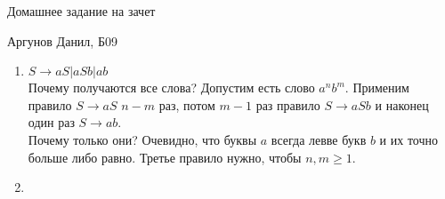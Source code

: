 \documentclass[12pt]{article}
\begin{document}
\begin{center} {\LARGE Домашнее задание на зачет} \end{center}
\begin{center} {Аргунов Данил, Б09} \end{center}

\bigskip
	
\begin{enumerate}
	\item $S \rightarrow aS | aSb | ab$\\
	Почему получаются все слова? Допустим есть слово $a^n b^m$. Применим правило $S \rightarrow aS$ $n-m$ раз, потом $m-1$ раз правило $S \rightarrow aSb$ и наконец один раз $S \rightarrow ab$.\\
	Почему только они? Очевидно, что буквы $a$ всегда левве букв $b$ и их точно больше либо равно. Третье правило нужно, чтобы $n, m \geqslant 1$.
	\item 
	
\end{enumerate}
\end{document}
